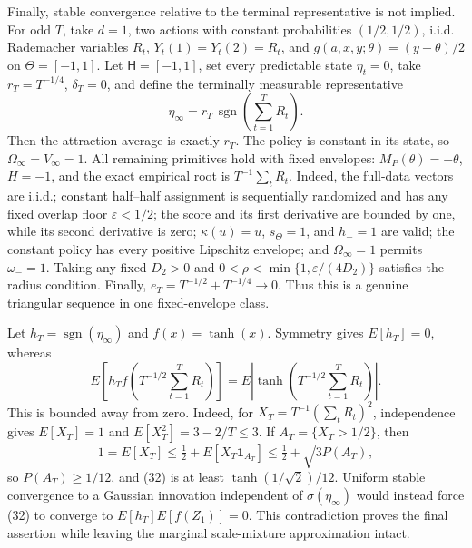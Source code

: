 Finally, stable convergence relative to the terminal representative is not implied. For odd \(T\), take \(d=1\), two actions with constant probabilities \((1/2,1/2)\), i.i.d. Rademacher variables \(R_t\), \(Y_t(1)=Y_t(2)=R_t\), and \(g(a,x,y;\theta)=(y-\theta)/2\) on \(\Theta=[-1,1]\). Let \(\mathsf H=[-1,1]\), set every predictable state \(\eta_t=0\), take \(r_T=T^{-1/4}\), \(\delta_T=0\), and define the terminally measurable representative
\[
 \eta_\infty=r_T\,\operatorname{sgn}\left(\sum_{t=1}^TR_t\right). \tag{31}
\]
Then the attraction average is exactly \(r_T\). The policy is constant in its state, so \(\Omega_\infty=V_\infty=1\). All remaining primitives hold with fixed envelopes: \(M_P(\theta)=-\theta\), \(H=-1\), and the exact empirical root is \(T^{-1}\sum_tR_t\). Indeed, the full-data vectors are i.i.d.; constant half--half assignment is sequentially randomized and has any fixed overlap floor \(\varepsilon<1/2\); the score and its first derivative are bounded by one, while its second derivative is zero; \(\kappa(u)=u\), \(s_\Theta=1\), and \(h_-=1\) are valid; the constant policy has every positive Lipschitz envelope; and \(\Omega_\infty=1\) permits \(\omega_-=1\). Taking any fixed \(D_2>0\) and \(0<\rho<\min\{1,\varepsilon/(4D_2)\}\) satisfies the radius condition. Finally, \(e_T=T^{-1/2}+T^{-1/4}\to0\). Thus this is a genuine triangular sequence in one fixed-envelope class.

Let \(h_T=\operatorname{sgn}(\eta_\infty)\) and \(f(x)=\tanh(x)\). Symmetry gives \(E[h_T]=0\), whereas
\[
 E\left[h_Tf\left(T^{-1/2}\sum_{t=1}^TR_t\right)\right]
 =E\left|\tanh\left(T^{-1/2}\sum_{t=1}^TR_t\right)\right|. \tag{32}
\]
This is bounded away from zero. Indeed, for \(X_T=T^{-1}(\sum_tR_t)^2\), independence gives \(E[X_T]=1\) and \(E[X_T^2]=3-2/T\le3\). If \(A_T=\{X_T>1/2\}\), then
\[
 1=E[X_T]\le\tfrac12+E[X_T\mathbf1_{A_T}]
 \le\tfrac12+\sqrt{3P(A_T)},
\]
so \(P(A_T)\ge1/12\), and (32) is at least \(\tanh(1/\sqrt2)/12\). Uniform stable convergence to a Gaussian innovation independent of \(\sigma(\eta_\infty)\) would instead force (32) to converge to \(E[h_T]E[f(Z_1)]=0\). This contradiction proves the final assertion while leaving the marginal scale-mixture approximation intact.